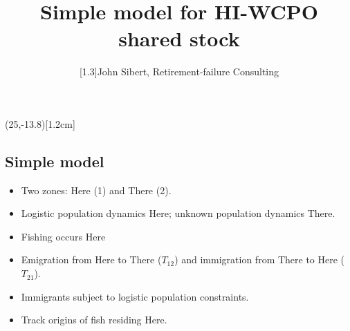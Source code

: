 \documentclass[a4paper,KOMA,landscape,titlepage]{powersem}
\begin{document}
\pageTransitionReplace
\pagecounter[on]


\freelogo(25,-13.8)[1.2cm] %



\author{\scalebox{1}[1.3]{John Sibert, Retirement-failure Consulting}} 
\title{Simple model for HI-WCPO shared stock}

\address{\href{mailto:sibert@hawaii.edu}{sibert@hawaii.edu}}


\begin{slide}
\maketitle
\end{slide}

\centerslidesfalse

\begin{slide}\section{Simple model}
\begin{itemize}
\item Two zones: Here (1) and There (2).
\item Logistic population dynamics Here; unknown population dynamics There.
\item Fishing occurs Here
\item Emigration from Here to There ($T_{12}$) and immigration from
There to Here ($T_{21}$).
\item Immigrants subject to logistic population constraints.
\item Track origins of fish residing Here.
\end{itemize}
\end{slide}
\end{document}
